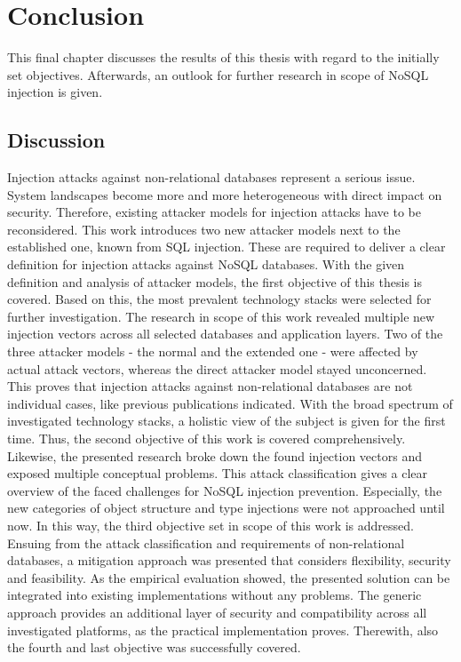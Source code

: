 \chapter{Conclusion}
This final chapter discusses the results of this thesis with regard to the initially set objectives. Afterwards, an outlook for further research in scope of NoSQL injection is given.

\section{Discussion}
Injection attacks against non-relational databases represent a serious issue. System landscapes become more and more heterogeneous with direct impact on security. Therefore, existing attacker models for injection attacks have to be reconsidered. This work introduces two new attacker models next to the established one, known from SQL injection. These are required to deliver a clear definition for injection attacks against NoSQL databases. With the given definition and analysis of attacker models, the first objective of this thesis is covered. Based on this, the most prevalent technology stacks were selected for further investigation. The research in scope of this work revealed multiple new injection vectors across all selected databases and application layers. Two of the three attacker models - the normal and the extended one - were affected by actual attack vectors, whereas the direct attacker model stayed unconcerned. This proves that injection attacks against non-relational databases are not individual cases, like previous publications indicated. With the broad spectrum of investigated technology stacks, a holistic view of the subject is given for the first time. Thus, the second objective of this work is covered comprehensively. Likewise, the presented research broke down the found injection vectors and exposed multiple conceptual problems. This attack classification gives a clear overview of the faced challenges for NoSQL injection prevention. Especially, the new categories of object structure and type injections were not approached until now. In this way, the third objective set in scope of this work is addressed. Ensuing from the attack classification and requirements of non-relational databases, a mitigation approach was presented that considers flexibility, security and feasibility. As the empirical evaluation showed, the presented solution can be integrated into existing implementations without any problems. The generic approach provides an additional layer of security and compatibility across all investigated platforms, as the practical implementation proves. Therewith, also the fourth and last objective was successfully covered. \\


